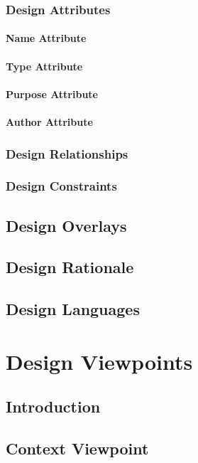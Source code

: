 \documentclass[letterpaper,10pt,titlepage,draftclsnofoot,onecolumn,onesided] {IEEEtran}
\begin{document}
\subsubsection{Design Attributes}
\paragraph{Name Attribute}
\paragraph{Type Attribute}
\paragraph{Purpose Attribute}
\paragraph{Author Attribute}
\subsubsection{Design Relationships}
\subsubsection{Design Constraints}

\subsection{Design Overlays}

\subsection{Design Rationale}

\subsection{Design Languages}

\section{Design Viewpoints}

\subsection{Introduction}

\subsection{Context Viewpoint}
\end{document}
